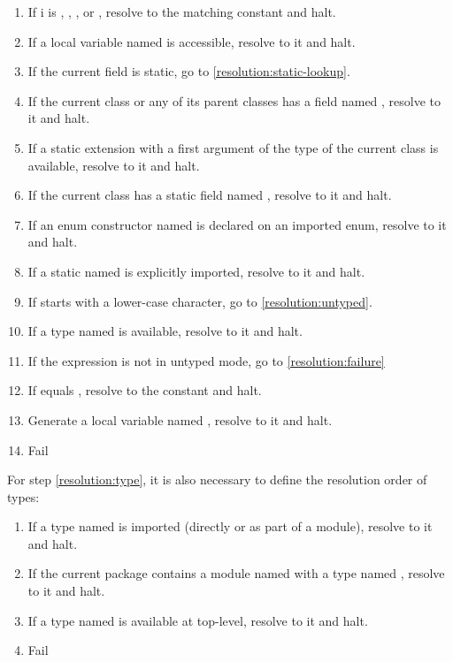 \begin{enumerate}
	\item If i is , , ,  or , resolve to the matching constant and halt.
	\item If a local variable named  is accessible, resolve to it and halt.
	\item If the current field is static, go to \ref{resolution:static-lookup}.
	\item If the current class or any of its parent classes has a field named , resolve to it and halt.
	\item\label{resolution:static-extension} If a static extension with a first argument of the type of the current class is available, resolve to it and halt.
	\item\label{resolution:static-lookup} If the current class has a static field named , resolve to it and halt.
	\item\label{resolution:enum-ctor} If an enum constructor named  is declared on an imported enum, resolve to it and halt.
	\item If a static named  is explicitly imported, resolve to it and halt.
	\item If  starts with a lower-case character, go to \ref{resolution:untyped}.
	\item\label{resolution:type} If a type named  is available, resolve to it and halt.
	\item\label{resolution:untyped} If the expression is not in untyped mode, go to \ref{resolution:failure}
	\item If  equals , resolve to the  constant and halt.
	\item Generate a local variable named , resolve to it and halt.
	\item\label{resolution:failure} Fail
\end{enumerate}

For step \ref{resolution:type}, it is also necessary to define the resolution order of types:

\begin{enumerate}
	\item\label{resolution:import} If a type named  is imported (directly or as part of a module), resolve to it and halt.
	\item If the current package contains a module named  with a type named , resolve to it and halt.
	\item If a type named  is available at top-level, resolve to it and halt.
	\item Fail
\end{enumerate}

